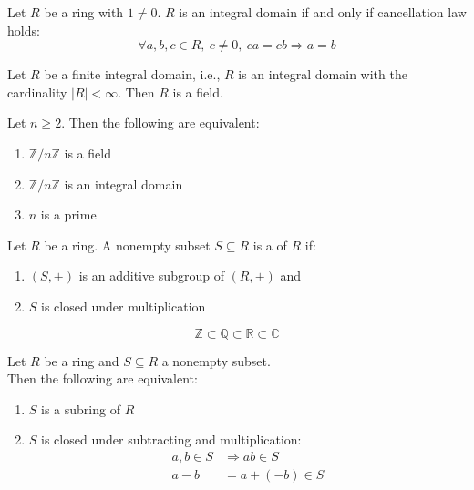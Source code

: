 \begin{proposition}
Let $R$ be a ring with $1 \neq 0$. $R$ is an integral domain if and only if cancellation law holds: 
\begin{equation}
\forall a, b, c \in R, \ c \neq 0, \ ca=cb \Rightarrow a=b \nonumber
\end{equation}
\end{proposition}


\begin{corollary}
Let $R$ be a finite integral domain, i.e., $R$ is an integral domain with the cardinality $\left| R \right| < \infty$. Then $R$ is a field.\\
\end{corollary}


\begin{proposition}
Let $n \geq 2$. Then the following are equivalent:
\begin{enumerate}[label=(\roman*)]
\item $\mathbb{Z}/n\mathbb{Z}$ is a field
\item $\mathbb{Z}/n\mathbb{Z}$ is an integral domain
\item $n$ is a prime
\end{enumerate}
\end{proposition}


\begin{definition}
Let $R$ be a ring. A nonempty subset $S \subseteq R$ is a  of $R$ if:
\begin{enumerate}[label=(\roman*)]
\item $(S, +)$ is an additive subgroup of $(R, +)$ and
\item $S$ is closed under multiplication
\end{enumerate}
\begin{equation}
\mathbb{Z} \subset \mathbb{Q} \subset \mathbb{R} \subset \mathbb{C} \nonumber
\end{equation}
\end{definition}


\begin{proposition}
 Let $R$ be a ring and $S \subseteq R$ a nonempty subset. \\
Then the following are equivalent:
\begin{enumerate}[label=(\roman*)]
\item $S$ is a subring of $R$
\item $S$ is closed under subtracting and multiplication:
\begin{align}
a,b\in S &\Rightarrow ab\in S \nonumber \\
a-b &= a + (-b) \in S \nonumber
\end{align}
\end{enumerate}
\end{proposition}


